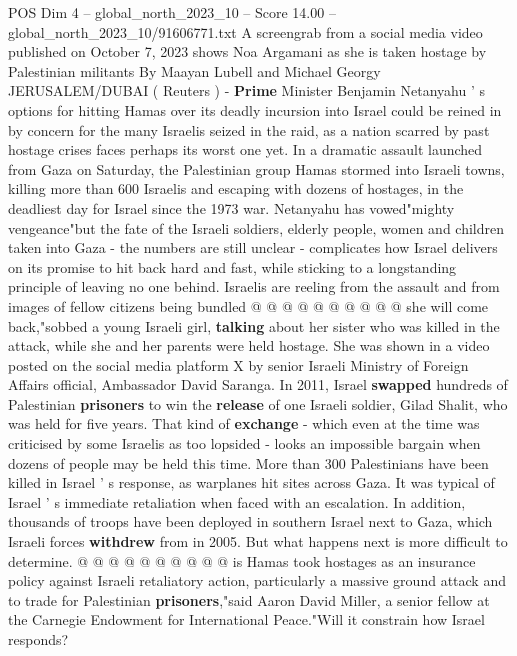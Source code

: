 \begin{textsample}{POS Dim 4 – global\_north\_2023\_10 – Score 14.00 – global\_north\_2023\_10/91606771.txt}  \label{ex:f4_pos_446}
A screengrab from a social media video published on October 7, 2023 shows Noa Argamani as she is taken hostage by Palestinian militants By Maayan Lubell and Michael Georgy JERUSALEM/DUBAI ( Reuters ) - \textbf{Prime} Minister Benjamin Netanyahu ' s options for hitting Hamas over its deadly incursion into Israel could be reined in by concern for the many Israelis seized in the raid, as a nation scarred by past hostage crises faces perhaps its worst one yet.
In a dramatic assault launched from Gaza on Saturday, the Palestinian group Hamas stormed into Israeli towns, killing more than 600 Israelis and escaping with dozens of hostages, in the deadliest day for Israel since the 1973 war.
Netanyahu has vowed"mighty vengeance"but the fate of the Israeli soldiers, elderly people, women and children taken into Gaza - the numbers are still unclear - complicates how Israel delivers on its promise to hit back hard and fast, while sticking to a longstanding principle of leaving no one behind.
Israelis are reeling from the assault and from images of fellow citizens being bundled @ @ @ @ @ @ @ @ @ @ she will come back,"sobbed a young Israeli girl, \textbf{talking} about her sister who was killed in the attack, while she and her parents were held hostage.
She was shown in a video posted on the social media platform X by senior Israeli Ministry of Foreign Affairs official, Ambassador David Saranga.
In 2011, Israel \textbf{swapped} hundreds of Palestinian \textbf{prisoners} to win the \textbf{release} of one Israeli soldier, Gilad Shalit, who was held for five years.
That kind of \textbf{exchange} - which even at the time was criticised by some Israelis as too lopsided - looks an impossible bargain when dozens of people may be held this time.
More than 300 Palestinians have been killed in Israel ' s response, as warplanes hit sites across Gaza.
It was typical of Israel ' s immediate retaliation when faced with an escalation.
In addition, thousands of troops have been deployed in southern Israel next to Gaza, which Israeli forces \textbf{withdrew} from in 2005.
But what happens next is more difficult to determine. @ @ @ @ @ @ @ @ @ @ is Hamas took hostages as an insurance policy against Israeli retaliatory action, particularly a massive ground attack and to trade for Palestinian \textbf{prisoners},"said Aaron David Miller, a senior fellow at the Carnegie Endowment for International Peace."Will it constrain how Israel responds?

\end{textsample}
